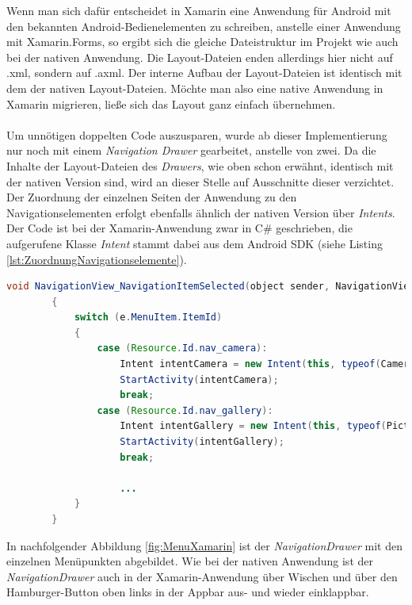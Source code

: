 Wenn man sich dafür entscheidet in Xamarin eine Anwendung für Android mit den bekannten Android-Bedienelementen zu schreiben, anstelle einer Anwendung mit Xamarin.Forms, so ergibt sich die gleiche Dateistruktur im Projekt wie auch bei der nativen Anwendung. Die Layout-Dateien enden allerdings hier nicht auf .xml, sondern auf .axml. Der interne Aufbau der Layout-Dateien ist identisch mit dem der nativen Layout-Dateien. Möchte man also eine native Anwendung in Xamarin migrieren, ließe sich das Layout ganz einfach übernehmen. 
\\
\\
Um unnötigen doppelten Code auszusparen, wurde ab dieser Implementierung nur noch mit einem \textit{Navigation Drawer} gearbeitet, anstelle von zwei. Da die Inhalte der Layout-Dateien des \textit{Drawers}, wie oben schon erwähnt, identisch mit der nativen Version sind, wird an dieser Stelle auf Ausschnitte dieser verzichtet. Der Zuordnung der einzelnen Seiten der Anwendung zu den Navigationselementen erfolgt ebenfalls ähnlich der nativen Version über \textit{Intents}. Der Code ist bei der Xamarin-Anwendung zwar in C\# geschrieben, die aufgerufene Klasse \textit{Intent} stammt dabei aus dem Android SDK (siehe Listing \ref{lst:ZuordnungNavigationselemente}). 

\begin{lstlisting}[caption=Zuweisung der einzelnen Seiten der Anwendung zu den Navigationselementen im Navigation Drawer, label=lst:ZuordnungNavigationselemente, language=Java]
void NavigationView_NavigationItemSelected(object sender, NavigationView.NavigationItemSelectedEventArgs e)
        {
            switch (e.MenuItem.ItemId)
            {
                case (Resource.Id.nav_camera):
                    Intent intentCamera = new Intent(this, typeof(CameraActivity));
                    StartActivity(intentCamera);
                    break;
                case (Resource.Id.nav_gallery):
                    Intent intentGallery = new Intent(this, typeof(PictureGalleryActivity));
                    StartActivity(intentGallery);
                    break;
                    
                    ...
            }
        }
\end{lstlisting}


In nachfolgender Abbildung \ref{fig:MenuXamarin} ist der \textit{NavigationDrawer} mit den einzelnen Menüpunkten abgebildet. Wie bei der nativen Anwendung ist der \textit{NavigationDrawer} auch in der Xamarin-Anwendung über Wischen und über den Hamburger-Button oben links in der Appbar aus- und wieder einklappbar.
\clearpage

